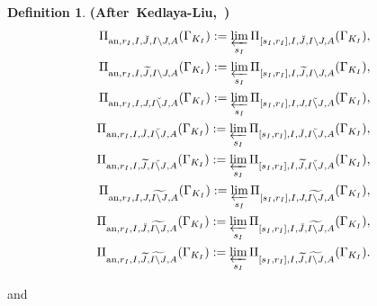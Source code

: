 \documentclass[12pt]{amsart}
\theoremstyle{definition}
\newtheorem{definition}[theorem]{Definition}
\numberwithin{equation}{section}
\begin{document}
\begin{definition} \mbox{\bf{(After Kedlaya-Liu, \cite[Definition 5.2.1]{KL2})}}
\begin{align}
\Pi_{\mathrm{an},r_I,I,\breve{J},I\backslash J,A}(\Gamma_{K_I}):=\varprojlim_{s_I}\Pi_{[s_I,r_I],I,\breve{J},I\backslash J,A}(\Gamma_{K_I}),\\	
\Pi_{\mathrm{an},r_I,I,\widetilde{J},I\backslash J,A}(\Gamma_{K_I}):=\varprojlim_{s_I} \Pi_{[s_I,r_I],I,\widetilde{J},I\backslash J,A}(\Gamma_{K_I}),\\
\Pi_{\mathrm{an},r_I,I,J,\breve{I\backslash J},A}(\Gamma_{K_I}):=\varprojlim_{s_I}\Pi_{[s_I,r_I],I,J,\breve{I\backslash J},A}(\Gamma_{K_I}),\\	
\Pi_{\mathrm{an},r_I,I,\breve{J},\breve{I\backslash J},A}(\Gamma_{K_I}):=\varprojlim_{s_I} \Pi_{[s_I,r_I],I,\breve{J},\breve{I\backslash J},A}(\Gamma_{K_I}),\\	
\Pi_{\mathrm{an},r_I,I,\widetilde{J},\breve{I\backslash J},A}(\Gamma_{K_I}):=\varprojlim_{s_I} \Pi_{[s_I,r_I],I,\widetilde{J},\breve{I\backslash J},A}(\Gamma_{K_I}),\\
\Pi_{\mathrm{an},r_I,I,J,\widetilde{I\backslash J},A}(\Gamma_{K_I}):=\varprojlim_{s_I} \Pi_{[s_I,r_I],I,J,\widetilde{I\backslash J},A}(\Gamma_{K_I}),\\	
\Pi_{\mathrm{an},r_I,I,\breve{J},\widetilde{I\backslash J},A}(\Gamma_{K_I}):=\varprojlim_{s_I} \Pi_{[s_I,r_I],I,\breve{J},\widetilde{I\backslash J},A}(\Gamma_{K_I}),\\	
\Pi_{\mathrm{an},r_I,I,\widetilde{J},\widetilde{I\backslash J},A}(\Gamma_{K_I}):=\varprojlim_{s_I} \Pi_{[s_I,r_I],I,\widetilde{J},\widetilde{I\backslash J},A}(\Gamma_{K_I}).	
\end{align}

and 


\end{definition}
\end{document}
